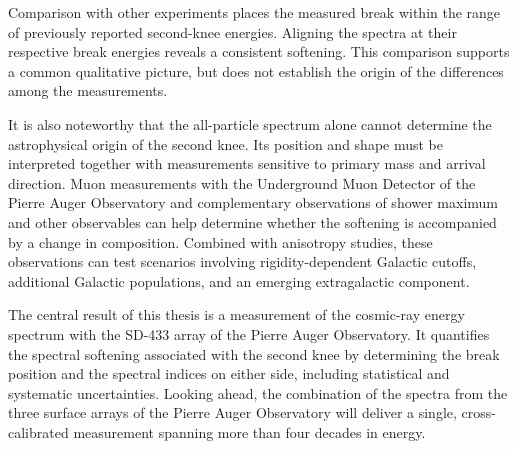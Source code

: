 \documentclass[main.tex]{subfiles}
\begin{document}
Comparison with other experiments places the measured break within the range of previously reported second-knee energies. Aligning the spectra at their respective break energies reveals a consistent softening. This comparison supports a common qualitative picture, but does not establish the origin of the differences among the measurements.

It is also noteworthy that the all-particle spectrum alone cannot determine the astrophysical origin of the second knee. Its position and shape must be interpreted together with measurements sensitive to primary mass and arrival direction. Muon measurements with the Underground Muon Detector of the Pierre Auger Observatory and complementary observations of shower maximum and other observables can help determine whether the softening is accompanied by a change in composition. Combined with anisotropy studies, these observations can test scenarios involving rigidity-dependent Galactic cutoffs, additional Galactic populations, and an emerging extragalactic component.

The central result of this thesis is a measurement of the cosmic-ray energy spectrum with the SD-433 array of the Pierre Auger Observatory. It quantifies the spectral softening associated with the second knee by determining the break position and the spectral indices on either side, including statistical and systematic uncertainties. 
Looking ahead, the combination of the spectra from the three surface arrays of the Pierre Auger Observatory will deliver a single, cross-calibrated measurement spanning more than four decades in energy.
\end{document}
